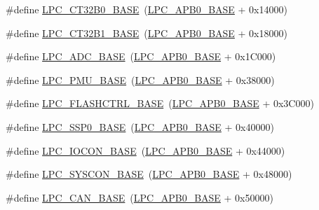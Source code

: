 \begin{DoxyCompactItemize}
\#define \hyperlink{group___l_p_c11xx___definitions_ga10dcc3ac224bf132010cb6bc6fc7d9c9}{L\+P\+C\+\_\+\+C\+T32\+B0\+\_\+\+B\+A\+SE}~(\hyperlink{group___l_p_c11xx___definitions_ga55cab996c3594a0f4cc459ec8e10daea}{L\+P\+C\+\_\+\+A\+P\+B0\+\_\+\+B\+A\+SE} + 0x14000)
\item 
\#define \hyperlink{group___l_p_c11xx___definitions_ga70f807832b5a2afb17265d22fed6160d}{L\+P\+C\+\_\+\+C\+T32\+B1\+\_\+\+B\+A\+SE}~(\hyperlink{group___l_p_c11xx___definitions_ga55cab996c3594a0f4cc459ec8e10daea}{L\+P\+C\+\_\+\+A\+P\+B0\+\_\+\+B\+A\+SE} + 0x18000)
\item 
\#define \hyperlink{group___l_p_c11xx___definitions_ga2396e0d0c565e4c1c3b2fc593bd6c37f}{L\+P\+C\+\_\+\+A\+D\+C\+\_\+\+B\+A\+SE}~(\hyperlink{group___l_p_c11xx___definitions_ga55cab996c3594a0f4cc459ec8e10daea}{L\+P\+C\+\_\+\+A\+P\+B0\+\_\+\+B\+A\+SE} + 0x1\+C000)
\item 
\#define \hyperlink{group___l_p_c11xx___definitions_ga865bed8ad61e9e273439ad1349a46d68}{L\+P\+C\+\_\+\+P\+M\+U\+\_\+\+B\+A\+SE}~(\hyperlink{group___l_p_c11xx___definitions_ga55cab996c3594a0f4cc459ec8e10daea}{L\+P\+C\+\_\+\+A\+P\+B0\+\_\+\+B\+A\+SE} + 0x38000)
\item 
\#define \hyperlink{group___l_p_c11xx___definitions_gad8bd09a830e15ea80293576f61deeccd}{L\+P\+C\+\_\+\+F\+L\+A\+S\+H\+C\+T\+R\+L\+\_\+\+B\+A\+SE}~(\hyperlink{group___l_p_c11xx___definitions_ga55cab996c3594a0f4cc459ec8e10daea}{L\+P\+C\+\_\+\+A\+P\+B0\+\_\+\+B\+A\+SE} + 0x3\+C000)
\item 
\#define \hyperlink{group___l_p_c11xx___definitions_ga53fb1af80b541545988f2a966681abfd}{L\+P\+C\+\_\+\+S\+S\+P0\+\_\+\+B\+A\+SE}~(\hyperlink{group___l_p_c11xx___definitions_ga55cab996c3594a0f4cc459ec8e10daea}{L\+P\+C\+\_\+\+A\+P\+B0\+\_\+\+B\+A\+SE} + 0x40000)
\item 
\#define \hyperlink{group___l_p_c11xx___definitions_gae48aea115d5924805263d7a15402d4fa}{L\+P\+C\+\_\+\+I\+O\+C\+O\+N\+\_\+\+B\+A\+SE}~(\hyperlink{group___l_p_c11xx___definitions_ga55cab996c3594a0f4cc459ec8e10daea}{L\+P\+C\+\_\+\+A\+P\+B0\+\_\+\+B\+A\+SE} + 0x44000)
\item 
\#define \hyperlink{group___l_p_c11xx___definitions_ga976cd83a81fd89a472221e68f0c0fbff}{L\+P\+C\+\_\+\+S\+Y\+S\+C\+O\+N\+\_\+\+B\+A\+SE}~(\hyperlink{group___l_p_c11xx___definitions_ga55cab996c3594a0f4cc459ec8e10daea}{L\+P\+C\+\_\+\+A\+P\+B0\+\_\+\+B\+A\+SE} + 0x48000)
\item 
\#define \hyperlink{group___l_p_c11xx___definitions_gaeae0f80f43f37b41a8a1c3cb7028d22f}{L\+P\+C\+\_\+\+C\+A\+N\+\_\+\+B\+A\+SE}~(\hyperlink{group___l_p_c11xx___definitions_ga55cab996c3594a0f4cc459ec8e10daea}{L\+P\+C\+\_\+\+A\+P\+B0\+\_\+\+B\+A\+SE} + 0x50000)

\end{DoxyCompactItemize}
